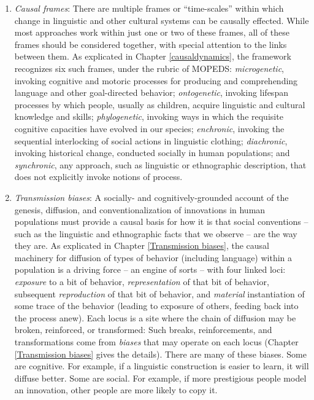 \begin{enumerate}
\item[] {\textit{Causal frames}: There are multiple frames or ``time-scales'' within which change in linguistic and other cultural systems can be causally effected. While most approaches work within just one or two of these frames, all of these frames should be considered together, with special attention to the links between them. As explicated in Chapter \ref{causaldynamics}, the framework recognizes six such frames, under the rubric of MOPEDS: \textit{microgenetic}, invoking cognitive and motoric processes for producing and comprehending language and other goal-directed behavior; \textit{ontogenetic}, invoking lifespan processes by which people, usually as children, acquire linguistic and cultural knowledge and skills; \textit{phylogenetic}, invoking ways in which the requisite cognitive capacities have evolved in our species; \textit{enchronic}, invoking the sequential interlocking of social actions in linguistic clothing; \textit{diachronic}, invoking historical change, conducted socially in human populations; and \textit{synchronic}, any approach, such as linguistic or ethnographic description, that does not explicitly invoke notions of process.}

\item[] {\textit{Transmission biases}: A socially- and cognitively-grounded account of the genesis, diffusion, and conventionalization of innovations in human populations must provide a causal basis for how it is that social conventions -- such as the linguistic and ethnographic facts that we observe -- are the way they are. As explicated in Chapter \ref{Transmission biases}, the causal machinery for diffusion of types of behavior (including language) within a population is a driving force -- an engine of sorts -- with four linked loci: \textit{exposure} to a bit of behavior, \textit{representation} of that bit of behavior, subsequent \textit{reproduction} of that bit of behavior, and \textit{material} instantiation of some trace of the behavior (leading to exposure of others, feeding back into the process anew). Each locus is a site where the chain of diffusion may be broken, reinforced, or transformed: Such breaks, reinforcements, and transformations come from \textit{biases} that may operate on each locus (Chapter \ref{Transmission biases} gives the details). There are many of these biases. Some are cognitive. For example, if a linguistic construction is easier to learn, it will diffuse better. Some are social. For example, if more prestigious people model an innovation, other people are more likely to copy it. }
\end{enumerate}

